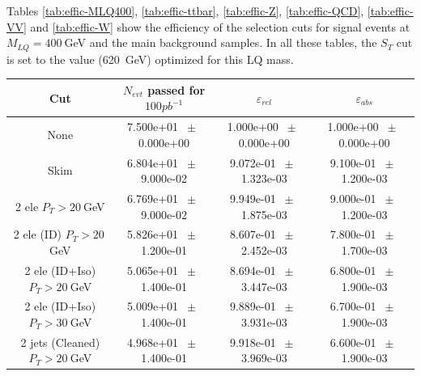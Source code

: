 Tables  
\ref{tab:effic-MLQ400}, 
\ref{tab:effic-ttbar}, 
\ref{tab:effic-Z}, 
\ref{tab:effic-QCD},
\ref{tab:effic-VV} and
\ref{tab:effic-W}
show the efficiency of the selection cuts for signal events at $M_{LQ}=400~$GeV and the main background samples.
In all these tables, the $S_T$ cut is set to the value (620~GeV) optimized for this LQ mass.  

\begin{table}[htbp] 
\begin{center} 
\begin{tabular}{|c|c|c|c|} 
\hline\hline 
 Cut & $N_{evt}$ passed for $100pb^{-1}$ & $\varepsilon_{rel}$ & $\varepsilon_{abs}$ \\ 
\hline\hline 
None          &           7.500e+01          $~\pm~$          0.000e+00           &           1.000e+00          $~\pm~$          0.000e+00           &           1.000e+00          $~\pm~$          0.000e+00          \\          
          Skim          &           6.804e+01          $~\pm~$          9.000e-02           &           9.072e-01          $~\pm~$          1.323e-03           &           9.100e-01          $~\pm~$          1.200e-03          \\          
          2 ele $P_T>20~$GeV          &           6.769e+01          $~\pm~$          9.000e-02           &           9.949e-01          $~\pm~$          1.875e-03           &           9.000e-01          $~\pm~$          1.200e-03          \\          
          2 ele (ID) $P_T>20~$GeV          &           5.826e+01          $~\pm~$          1.200e-01           &           8.607e-01          $~\pm~$          2.452e-03           &           7.800e-01          $~\pm~$          1.700e-03          \\          
          2 ele (ID+Iso) $P_T>20~$GeV          &           5.065e+01          $~\pm~$          1.400e-01           &           8.694e-01          $~\pm~$          3.447e-03           &           6.800e-01          $~\pm~$          1.900e-03          \\          
          2 ele (ID+Iso) $P_T>30~$GeV          &           5.009e+01          $~\pm~$          1.400e-01           &           9.889e-01          $~\pm~$          3.931e-03           &           6.700e-01          $~\pm~$          1.900e-03          \\          
          2 jets (Cleaned) $P_T>20~$GeV          &           4.968e+01          $~\pm~$          1.400e-01           &           9.918e-01          $~\pm~$          3.969e-03           &           6.600e-01          $~\pm~$          1.900e-03          \\          

\end{tabular}
\end{center}
\end{table}
